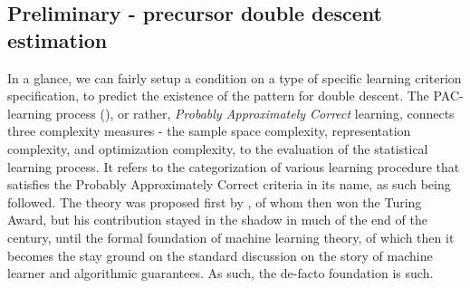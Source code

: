 \subsection{Preliminary - precursor double descent estimation}

In a glance, we can fairly setup a condition on a type of specific learning criterion specification, to predict the existence of the pattern for double descent. The PAC-learning process (\cite{10.5555/2621980,10.5555/2371238,STL_Hajek_Maxim_2021}), or rather, \textit{Probably Approximately Correct} learning, connects three complexity measures - the sample space complexity, representation complexity, and optimization complexity, to the evaluation of the statistical learning process. It refers to the categorization of various learning procedure that satisfies the Probably Approximately Correct criteria in its name, as such being followed. The theory was proposed first by \cite{10.1145/1968.1972}, of whom then won the Turing Award, but his contribution stayed in the shadow in much of the end of the century, until the formal foundation of machine learning theory, of which then it becomes the stay ground on the standard discussion on the story of machine learner and algorithmic guarantees. As such, the de-facto foundation is such. 


